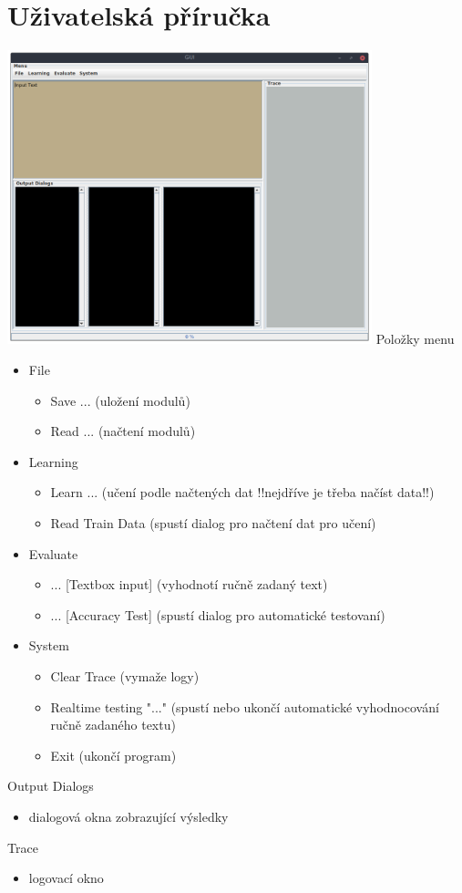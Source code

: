 \documentclass[a4paper,12pt]{article}
\begin{document}
\section{Uživatelská příručka}
  \includegraphics[width=400px]{main.png}
  Položky menu
  \begin{itemize} 
    \item File
    \begin{itemize}
      \item Save ... (uložení modulů) 
      \item Read ... (načtení modulů)
    \end{itemize}
    \item Learning
    \begin{itemize}
      \item Learn ... (učení podle načtených dat !!nejdříve je třeba načíst data!!)
      \item Read Train Data (spustí dialog pro načtení dat pro učení)
    \end{itemize}
    \item Evaluate
    \begin{itemize}
      \item ... [Textbox input] (vyhodnotí ručně zadaný text)
      \item ... [Accuracy Test] (spustí dialog pro automatické testovaní)
    \end{itemize}
    \item System
    \begin{itemize}
      \item Clear Trace (vymaže logy)
      \item Realtime testing "..." (spustí nebo ukončí automatické vyhodnocování ručně zadaného textu)
      \item Exit (ukončí program)
    \end{itemize}
  \end{itemize}
  Output Dialogs
  \begin{itemize}
    \item dialogová okna zobrazující výsledky
  \end{itemize}
  Trace
  \begin{itemize}
    \item logovací okno
  \end{itemize}
  \pagebreak
\end{document}
